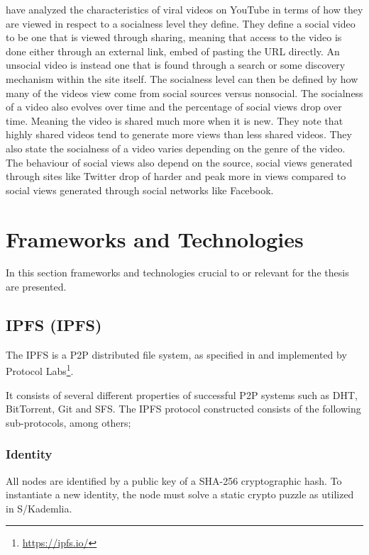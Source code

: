 \citeauthor{broxton2013catching} \cite{broxton2013catching} have analyzed the characteristics of viral videos on YouTube in terms of how they are viewed in respect to a socialness level they define. They define a social video to be one that is viewed through sharing, meaning that access to the video is done either through an external link, embed of pasting the URL directly. An unsocial video is instead one that is found through a search or some discovery mechanism within the site itself. The socialness level can then be defined by how many of the videos view come from social sources versus nonsocial. The socialness of a video also evolves over time and the percentage of social views drop over time. Meaning the video is shared much more when it is new. They note that highly shared videos tend to generate more views than less shared videos. They also state the socialness of a video varies depending on the genre of the video. The behaviour of social views also depend on the source, social views generated through sites like Twitter drop of harder and peak more in views compared to social views generated through social networks like Facebook.


\section{Frameworks and Technologies}
\label{sec:fram-techn}
In this section frameworks and technologies crucial to or relevant for the thesis are presented.

\subsection{\acl{IPFS} (\acs{IPFS})}
The \acs{IPFS} is a \acs{P2P} distributed file system, as specified in \cite{benet2014ipfs} and implemented by Protocol Labs\footnote{\url{https://ipfs.io/}}.

It consists of several different properties of successful \acs{P2P} systems such as \acs{DHT}, BitTorrent, Git and \ac{SFS}. The \acs{IPFS} protocol constructed consists of the following sub-protocols, among others;

\subsubsection{Identity}
All nodes are identified by a public key of a SHA-256 cryptographic hash. To instantiate a new identity, the node must solve a static crypto puzzle as utilized in S/Kademlia\cite{baumgart2007skademlia}.


